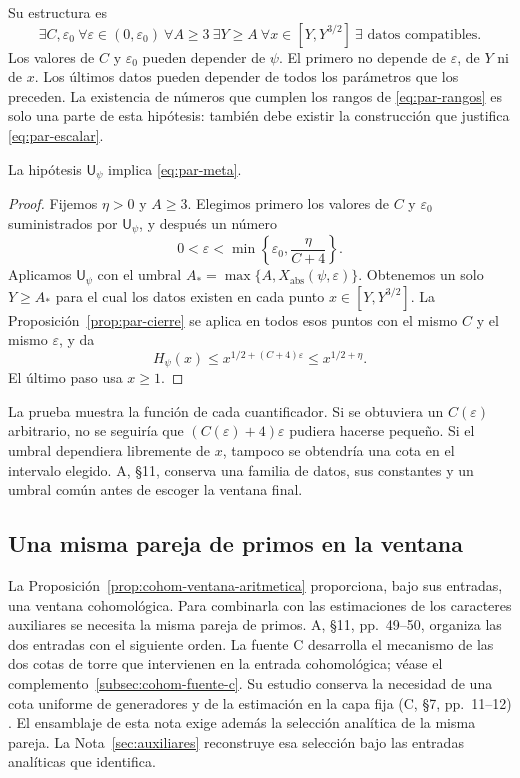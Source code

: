 Su estructura es
\begin{equation}
 \exists C,\varepsilon_0\
 \forall\varepsilon\in(0,\varepsilon_0)\
 \forall A\ge3\
 \exists Y\ge A\
 \forall x\in[Y,Y^{3/2}]\
 \exists\text{ datos compatibles}.
 \label{eq:par-cuantificadores}
\end{equation}
Los valores de $C$ y $\varepsilon_0$ pueden depender de $\psi$.
El primero no depende de $\varepsilon$, de $Y$ ni de $x$.
Los últimos datos pueden depender de todos los parámetros que los
preceden. La existencia de números que cumplen los rangos de
\eqref{eq:par-rangos} es solo una parte de esta hipótesis:
también debe existir la construcción que justifica
\eqref{eq:par-escalar}.

\begin{proposicion}[De la realización uniforme a las ventanas]
\label{prop:par-ventanas}
La hipótesis $\mathsf U_\psi$ implica \eqref{eq:par-meta}.
\end{proposicion}

\begin{proof}
Fijemos $\eta>0$ y $A\ge3$. Elegimos primero los valores de
$C$ y $\varepsilon_0$ suministrados por $\mathsf U_\psi$,
y después un número
\[
 0<\varepsilon<
       \min\left\{\varepsilon_0,\frac{\eta}{C+4}\right\}.
\]
Aplicamos $\mathsf U_\psi$ con el umbral
$A_*=\max\{A,X_{\mathrm{abs}}(\psi,\varepsilon)\}$.
Obtenemos un solo $Y\ge A_*$ para el cual los datos existen en
cada punto $x\in[Y,Y^{3/2}]$. La Proposición~\ref{prop:par-cierre}
se aplica en todos esos puntos con el mismo $C$ y el mismo
$\varepsilon$, y da
\[
 H_\psi(x)\le x^{1/2+(C+4)\varepsilon}
              \le x^{1/2+\eta}.
\]
El último paso usa $x\ge1$.
\end{proof}

La prueba muestra la función de cada cuantificador. Si se obtuviera
un $C(\varepsilon)$ arbitrario, no se seguiría que
$(C(\varepsilon)+4)\varepsilon$ pudiera hacerse pequeño.
Si el umbral dependiera libremente de $x$, tampoco se obtendría una
cota en el intervalo elegido. A, §11, conserva una familia de datos,
sus constantes y un umbral común antes de escoger la ventana final.

\subsection{Una misma pareja de primos en la ventana}

La Proposición~\ref{prop:cohom-ventana-aritmetica} proporciona,
bajo sus entradas, una ventana cohomológica. Para combinarla con
las estimaciones de los caracteres auxiliares se necesita la misma
pareja de primos. A, §11, pp.~49--50, organiza las dos entradas
con el siguiente orden. La fuente C desarrolla el mecanismo de las
dos cotas de torre que intervienen en la entrada cohomológica;
véase el complemento~\ref{subsec:cohom-fuente-c}. Su estudio conserva
la necesidad de una cota uniforme de generadores y de la estimación
en la capa fija (C, §7, pp.~11--12) \cite{fuenteC}.
El ensamblaje de esta nota exige además la selección analítica
de la misma pareja.
La Nota~\ref{sec:auxiliares} reconstruye esa selección bajo las
entradas analíticas que identifica.

